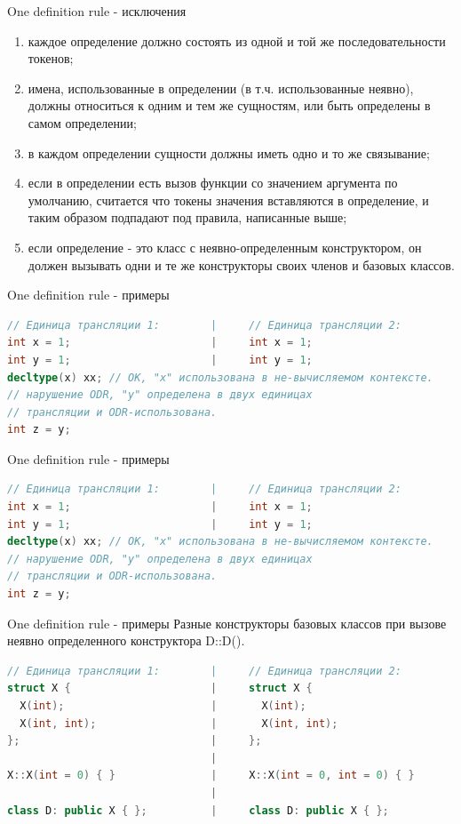 \documentclass[10pt]{beamer}
\begin{document}
\begin{frame}[fragile]{One definition rule - исключения}
\begin{enumerate}
\item каждое определение должно состоять из одной и той же последовательности токенов;
\item имена, использованные в определении (в т.ч. использованные неявно), должны относиться к одним и тем же сущностям, или быть определены в самом определении;
\item в каждом определении сущности должны иметь одно и то же связывание;
\item если в определении есть вызов функции со значением аргумента по умолчанию, считается что токены значения вставляются в определение, и таким образом подпадают под правила, написанные выше;
\item если определение - это класс с неявно-определенным конструктором, он должен вызывать одни и те же конструкторы своих членов и базовых классов.
\end{enumerate}
\end{frame}

\begin{frame}[fragile]{One definition rule - примеры}
\begin{lstlisting}[language=C++]
// Единица трансляции 1:        |     // Единица трансляции 2:
int x = 1;                      |     int x = 1;
int y = 1;                      |     int y = 1;
decltype(x) xx; // ОК, "x" использована в не-вычисляемом контексте.
// нарушение ODR, "y" определена в двух единицах 
// трансляции и ODR-использована.
int z = y; 
\end{lstlisting}
\end{frame}

\begin{frame}[fragile]{One definition rule - примеры}
\begin{lstlisting}[language=C++]
// Единица трансляции 1:        |     // Единица трансляции 2:
int x = 1;                      |     int x = 1;
int y = 1;                      |     int y = 1;
decltype(x) xx; // ОК, "x" использована в не-вычисляемом контексте.
// нарушение ODR, "y" определена в двух единицах 
// трансляции и ODR-использована.
int z = y; 
\end{lstlisting}
\end{frame}

\begin{frame}[fragile]{One definition rule - примеры}
Разные конструкторы базовых классов при вызове неявно определенного конструктора D::D().
\begin{lstlisting}[language=C++]
// Единица трансляции 1:        |     // Единица трансляции 2:
struct X {                      |     struct X {
  X(int);                       |       X(int);
  X(int, int);                  |       X(int, int);
};                              |     };
                                |
X::X(int = 0) { }               |     X::X(int = 0, int = 0) { }
                                |
class D: public X { };          |     class D: public X { };
\end{lstlisting}
\end{frame}
\end{document}
